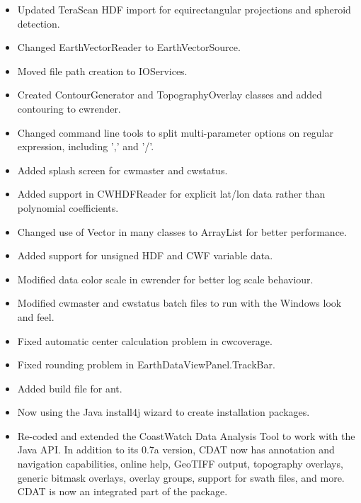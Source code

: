 \begin{itemize}

  \item Updated TeraScan HDF import for equirectangular projections
  and spheroid detection.

  \item Changed EarthVectorReader to EarthVectorSource.

  \item Moved file path creation to IOServices.

  \item Created ContourGenerator and TopographyOverlay classes and
  added contouring to cwrender.

  \item Changed command line tools to split multi-parameter options on
  regular expression, including ',' and '/'.

  \item Added splash screen for cwmaster and cwstatus.

  \item Added support in CWHDFReader for explicit lat/lon data rather
  than polynomial coefficients.

  \item Changed use of Vector in many classes to ArrayList for better
  performance.

  \item Added support for unsigned HDF and CWF variable data.

  \item Modified data color scale in cwrender for better log scale
  behaviour.

  \item Modified cwmaster and cwstatus batch files to run with the
  Windows look and feel.

  \item Fixed automatic center calculation problem in cwcoverage.

  \item Fixed rounding problem in EarthDataViewPanel.TrackBar.

  \item Added build file for ant.

  \item Now using the Java install4j wizard to create
  installation packages.

  \item Re-coded and extended the CoastWatch Data Analysis Tool to
  work with the Java API. In addition to its 0.7a version, CDAT now
  has annotation and navigation capabilities, online help, GeoTIFF
  output, topography overlays, generic bitmask overlays, overlay
  groups, support for swath files, and more. CDAT is now an integrated
  part of the package.


\end{itemize}

